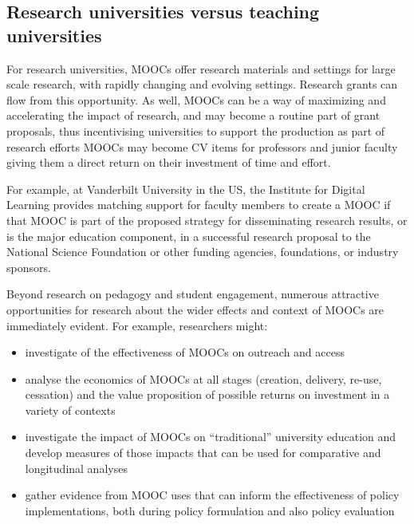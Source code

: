 \subsection{Research universities versus teaching universities}

For research universities, MOOCs offer research materials and settings
for large scale research, with rapidly changing and evolving
settings. Research grants can flow from this opportunity.
As well, MOOCs can be a way of maximizing and accelerating the impact of
research, and may become a routine part of grant proposals, thus
incentivising universities to support the production as part of research
efforts MOOCs may become CV items for professors and junior faculty
giving them a direct return on their investment of time and effort.

For example, at Vanderbilt University in the US, the Institute for
Digital Learning provides matching support for faculty members to create a
MOOC if that MOOC is part of the proposed strategy for disseminating
research results, or is the major education component, in a successful research
proposal to the National
Science Foundation or other funding agencies, foundations, or industry sponsors.

Beyond research on pedagogy and student engagement, numerous attractive
opportunities for research about the wider effects and context of MOOCs
are immediately evident.  For example, researchers might:

\begin{itemize}

\item investigate of the effectiveness of
MOOCs on outreach and access 

\item analyse the economics of MOOCs at all stages (creation, delivery,
re-use, cessation) and the value proposition of possible returns on
investment in a variety of contexts  

\item investigate the impact of MOOCs on
``traditional'' university education and develop measures of those impacts
that can be used for comparative and longitudinal analyses 

\item gather
evidence from MOOC uses that can inform the effectiveness of policy
implementations, both during policy formulation and also policy
evaluation

\end{itemize}

